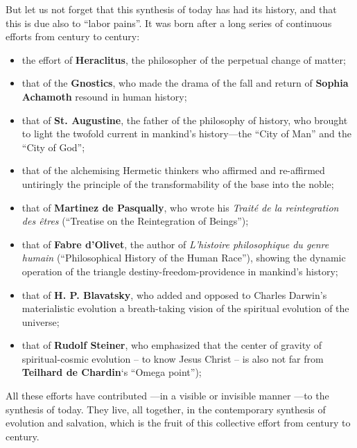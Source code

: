 \begin{quotex}
But let us not forget that this synthesis of today has had its history, and that this is due also to ``labor pains''. It was born after a long series of continuous efforts from century to century:

\begin{itemize}


\item the effort of \textbf{Heraclitus}, the philosopher of the perpetual change of matter;

\item that of the \textbf{Gnostics}, who made the drama of the fall and return of \textbf{Sophia Achamoth} resound in human history;

\item that of \textbf{St. Augustine}, the father of the philosophy of history, who brought to light the twofold current in mankind's history---the ``City of Man'' and the ``City of God'';

\item that of the alchemising Hermetic thinkers who affirmed and re-affirmed untiringly the principle of the transformability of the base into the noble;

\item that of \textbf{Martinez de Pasqually}, who wrote his \emph{Traité de la reintegration des êtres} (``Treatise on the Reintegration of Beings'');

\item that of \textbf{Fabre d'Olivet}, the author of \emph{L'histoire philosophique du genre humain} (``Philosophical History of the Human Race''), showing the dynamic operation of the triangle destiny-freedom-providence in mankind's history;

\item that of \textbf{H. P. Blavatsky}, who added and opposed to Charles Darwin's materialistic evolution a breath-taking vision of the spiritual evolution of the universe;

\item that of \textbf{Rudolf Steiner}, who emphasized that the center of gravity of spiritual-cosmic evolution -- to know Jesus Christ -- is also not far from \textbf{Teilhard de Chardin}`s ``Omega point'');
\end{itemize}

All these efforts have contributed ---in a visible or invisible manner ---to the synthesis of today. They live, all together, in the contemporary synthesis of evolution and salvation, which is the fruit of this collective effort from century to century.
\end{quotex}


